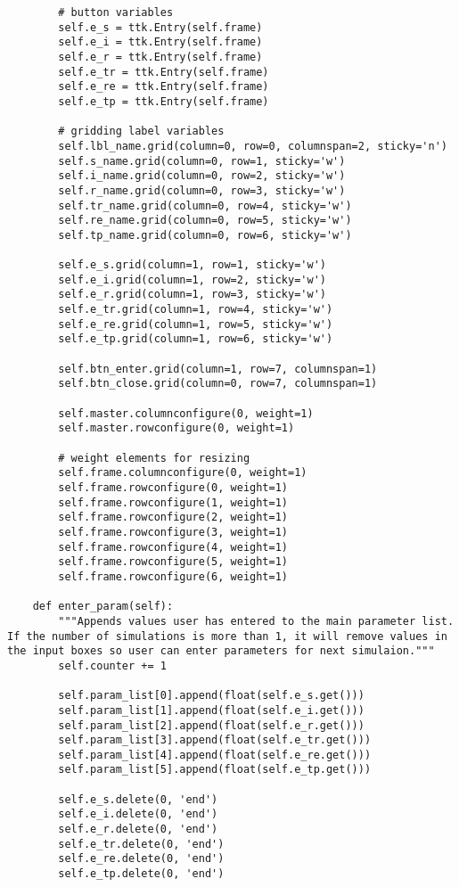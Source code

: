 \documentclass[11pt, a4paper]{article}
\begin{document}
\begin{lstlisting}
        # button variables
        self.e_s = ttk.Entry(self.frame)
        self.e_i = ttk.Entry(self.frame)
        self.e_r = ttk.Entry(self.frame)
        self.e_tr = ttk.Entry(self.frame)
        self.e_re = ttk.Entry(self.frame)
        self.e_tp = ttk.Entry(self.frame)

        # gridding label variables
        self.lbl_name.grid(column=0, row=0, columnspan=2, sticky='n')
        self.s_name.grid(column=0, row=1, sticky='w')
        self.i_name.grid(column=0, row=2, sticky='w')
        self.r_name.grid(column=0, row=3, sticky='w')
        self.tr_name.grid(column=0, row=4, sticky='w')
        self.re_name.grid(column=0, row=5, sticky='w')
        self.tp_name.grid(column=0, row=6, sticky='w')

        self.e_s.grid(column=1, row=1, sticky='w')
        self.e_i.grid(column=1, row=2, sticky='w')
        self.e_r.grid(column=1, row=3, sticky='w')
        self.e_tr.grid(column=1, row=4, sticky='w')
        self.e_re.grid(column=1, row=5, sticky='w')
        self.e_tp.grid(column=1, row=6, sticky='w')

        self.btn_enter.grid(column=1, row=7, columnspan=1)
        self.btn_close.grid(column=0, row=7, columnspan=1)

        self.master.columnconfigure(0, weight=1)
        self.master.rowconfigure(0, weight=1)

        # weight elements for resizing
        self.frame.columnconfigure(0, weight=1)
        self.frame.rowconfigure(0, weight=1)
        self.frame.rowconfigure(1, weight=1)
        self.frame.rowconfigure(2, weight=1)
        self.frame.rowconfigure(3, weight=1)
        self.frame.rowconfigure(4, weight=1)
        self.frame.rowconfigure(5, weight=1)
        self.frame.rowconfigure(6, weight=1)

    def enter_param(self):
        """Appends values user has entered to the main parameter list. If the number of simulations is more than 1, it will remove values in the input boxes so user can enter parameters for next simulaion."""
        self.counter += 1

        self.param_list[0].append(float(self.e_s.get()))
        self.param_list[1].append(float(self.e_i.get()))
        self.param_list[2].append(float(self.e_r.get()))
        self.param_list[3].append(float(self.e_tr.get()))
        self.param_list[4].append(float(self.e_re.get()))
        self.param_list[5].append(float(self.e_tp.get()))

        self.e_s.delete(0, 'end')
        self.e_i.delete(0, 'end')
        self.e_r.delete(0, 'end')
        self.e_tr.delete(0, 'end')
        self.e_re.delete(0, 'end')
        self.e_tp.delete(0, 'end')


\end{lstlisting}
\end{document}
